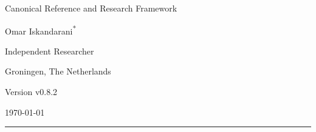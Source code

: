 \documentclass[11pt]{article}
\theoremstyle{definition}
\theoremstyle{plain}
\theoremstyle{remark}
\begin{document}
    
    \thispagestyle{empty}

    \begin{center}
        \vspace*{0.06\textheight}

        {\LARGE\bfseries \papertitle\par}
        \vspace{0.45cm}

        {\large Canonical Reference and Research Framework\par}
        \vspace{1.0cm}

        {\Large Omar Iskandarani\textsuperscript{*}\par}
        \vspace{0.35cm}

        {\normalsize Independent Researcher\par}
        {\normalsize Groningen, The Netherlands\par}
        \vspace{0.6cm}

        {\normalsize Version v0.8.2\par}
        {\normalsize \today\par}
        \vspace{0.9cm}

        \rule{0.82\textwidth}{0.5pt}
        \vspace{0.7cm}
    \end{center}

    \begin{abstract}
        \noindent
        This document presents Swirl-String Theory (SST) as a structured canonical synthesis rather than as a claim that every phenomenological sector has already been derived to theorem level. The text consolidates the primitive constant chain linking the effective fluid density, characteristic swirl speed, Compton anchoring, and core scale; records delay-induced mode selection as the preferred non-operator route to spectral discreteness; and organizes the atomic bridge, spectroscopic filter, relational-time sector, and topology-based mass program within one explicitly stratified framework. Throughout, orthodox inputs, SST-internal derivations, bridge-level constructions, and conjectural extensions are kept distinct so that the canon remains internally coherent, externally comparable, and open to falsification.
    \end{abstract}
\end{document}
